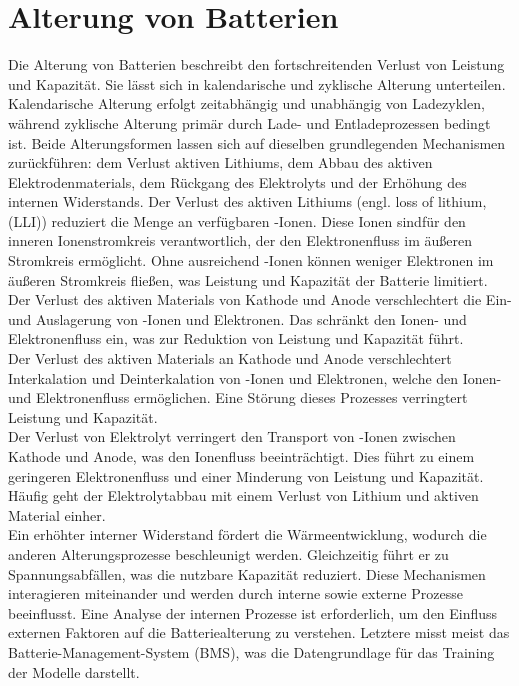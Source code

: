 \section{Alterung von Batterien}
Die Alterung von Batterien beschreibt den fortschreitenden Verlust von Leistung und Kapazität. Sie lässt sich in kalendarische und zyklische Alterung unterteilen. Kalendarische Alterung erfolgt zeitabhängig und unabhängig von Ladezyklen, während zyklische Alterung primär durch Lade- und Entladeprozessen bedingt ist. Beide Alterungsformen lassen sich auf dieselben grundlegenden Mechanismen zurückführen: dem Verlust aktiven Lithiums, dem Abbau des aktiven Elektrodenmaterials, dem Rückgang des Elektrolyts und der Erhöhung des internen Widerstands.
Der Verlust des aktiven Lithiums (engl. loss of lithium, (LLI)) reduziert die Menge an verfügbaren -Ionen. Diese Ionen sindfür den inneren Ionenstromkreis verantwortlich, der den Elektronenfluss im äußeren Stromkreis ermöglicht. Ohne ausreichend -Ionen können weniger Elektronen im äußeren Stromkreis fließen, was Leistung und Kapazität der Batterie limitiert.\\
Der Verlust des aktiven Materials von Kathode und Anode verschlechtert die Ein- und Auslagerung von -Ionen und Elektronen. Das schränkt den Ionen- und Elektronenfluss ein, was zur Reduktion von Leistung und Kapazität führt.\\
Der Verlust des aktiven Materials an Kathode und Anode verschlechtert Interkalation und Deinterkalation von -Ionen und Elektronen, welche den Ionen- und Elektronenfluss ermöglichen. Eine Störung dieses Prozesses verringtert Leistung und Kapazität.\\
Der Verlust von Elektrolyt verringert den Transport von -Ionen zwischen Kathode und Anode, was den Ionenfluss beeinträchtigt. Dies führt zu einem geringeren Elektronenfluss und einer Minderung von Leistung und Kapazität. Häufig geht der Elektrolytabbau mit einem  Verlust von Lithium und aktiven Material einher.\\
Ein erhöhter interner Widerstand fördert die Wärmeentwicklung, wodurch die anderen Alterungsprozesse beschleunigt werden. Gleichzeitig führt er zu Spannungsabfällen, was die nutzbare Kapazität reduziert.
Diese Mechanismen interagieren miteinander und werden durch interne sowie externe Prozesse beeinflusst. Eine Analyse der internen Prozesse ist erforderlich, um den Einfluss externen Faktoren auf die Batteriealterung zu verstehen. Letztere misst meist das Batterie-Management-System (BMS), was die Datengrundlage für das Training der Modelle darstellt.

